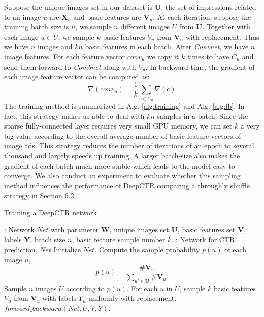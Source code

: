 \documentclass{sig-alternate-05-2015}
\begin{document}
Suppose the unique  images set in our dataset is $\mathbf{U}$, the set of impressions related to an image $u$ are $\mathbf{X}_{u}$ and basic features are $\mathbf{V}_{u}$. At each iteration, suppose the training batch size is $n$, we sample $n$ different images $U$ from $\mathbf{U}$. Together with each image $u \in U$, we sample $k$ basic features $V_{u}$ from $\mathbf{V}_{u}$ with replacement. Thus we have $n$ images and $kn$ basic features in each batch.   After \emph{Convnet}, we have $n$ image features. For each feature vector $conv_{u}$ we copy it $k$ times to have $C_{u}$ and send them forward to \emph{Combnet} along with $V_{u}$. In backward time, the gradient of each image feature vector can be computed as:
\begin{equation}\label{eq:gradient}
	\nabla(conv_{u}) = \frac{1}{k} \sum_{c \in C_{u}} \nabla(c)  
\end{equation}
The training method is summarized in Alg. \ref{alg:training} and Alg. \ref{alg:fb}. In fact, this strategy makes us able to deal with $kn$ samples in a batch. Since the sparse fully-connected layer requires very small GPU memory, we can set $k$ a very big value according to the overall average number of basic feature vectors of image ads. This strategy reduces the number of iterations of an epoch to several thousand and largely  speeds up training. A larger batch-size also makes the gradient of each batch much more stable which leads to the model easy to converge. We also conduct an experiment to evaluate whether this sampling method influences  the performance of DeepCTR comparing a throughly shuffle strategy in Section  6.2.
\begin{algorithm}[tb]
	\caption{Training a DeepCTR network}
	\label{alg:training}
	\begin{algorithmic}[1]
		\renewcommand{\algorithmicrequire}{\textbf{Input:}}
		\renewcommand{\algorithmicensure}{\textbf{Output:}}
		\Require: Network $Net$ with parameter $\mathbf{W}$, unique images set $\mathbf{U}$, basic features set $\mathbf{V}$, labels $\mathbf{Y}$, batch size $n$, basic feature sample number $k$.  
		\Ensure: Network for CTR prediction, $Net$
		\State Initialize $Net$.
		\State Compute the sample probability $p(u)$ of each image $u$,
		\begin{equation}
			p(u) = \frac{\# \mathbf{V}_{u}}{\sum_{u' \in \mathbf{U}} \# \mathbf{V}_{u'}}
		\end{equation}
		\Repeat
		\State Sample $n$ images $U$ according to $p(u)$. 
		\State For each $u$ in $U$, sample $k$ basic features $V_{u}$ from $\mathbf{V}_{u}$ with labels $Y_{u}$ uniformly with replacement. 
		\State $forward\_backward(Net, U, V, Y)$.
	\end{algorithmic}
\end{algorithm}  
\end{document}
